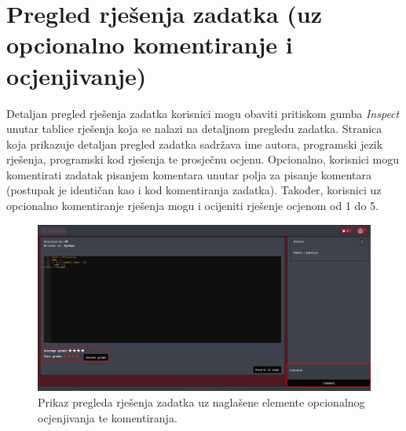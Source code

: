 \documentclass[times, utf8, zavrsni, numeric]{fer}
\begin{document}
		\section{Pregled rješenja zadatka (uz opcionalno komentiranje i ocjenjivanje)}
		Detaljan pregled rješenja zadatka korisnici mogu obaviti pritiskom gumba \textit{Inspect} unutar tablice rješenja koja se nalazi na detaljnom pregledu zadatka. Stranica koja prikazuje detaljan pregled zadatka sadržava ime autora, programski jezik rješenja, programski kod rješenja te prosječnu ocjenu. Opcionalno, korisnici mogu komentirati zadatak pisanjem komentara unutar polja za pisanje komentara (postupak je identičan kao i kod komentiranja zadatka). Također, korisnici uz opcionalno komentiranje rješenja mogu i ocijeniti rješenje ocjenom od 1 do 5.
		\begin{figure}[H]
			\centering
			\includegraphics[width=\linewidth]{pictures/koristenje/PregledRjesenja.png}
			\caption{Prikaz pregleda rješenja zadatka uz naglašene elemente opcionalnog ocjenjivanja te komentiranja.}
			\label{fig:pregledrjesenje}
		\end{figure}
	
\end{document}
